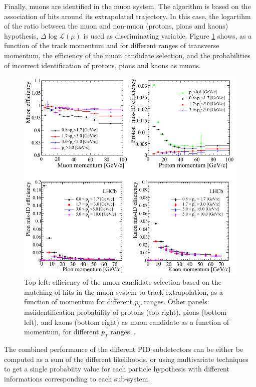 Finally, muons are identified in the muon system. The algorithm is based on the association of hits around its extrapolated trajectory. In this case, the logartihm of the ratio between the muon and non-muon (protons, pions and kaons)  hypothesis, $\Delta\log{\mathcal{L}(\mu)}$ is used as discriminating variable. Figure \ref{fig:PID5} shows, as a function of the track momentum and for different ranges of transverse momentum, the efficiency of the muon candidate selection, and the probabilities of incorrect identification of protons, pions and kaons as muons. 

\begin{figure} [htb!]
\begin{center}
\includegraphics[scale=0.7]{figs/PID5.png}
\caption{Top left: efficiency of the muon candidate selection based on the matching of hits in the muon system to track extrapolation, as a function of momentum for different $p_T$ ranges. Other panels: msiidentification probability of protons (top right), pions (bottom left), and kaons (bottom right) as muon candidate as a function of momentum, for different $p_T$ ranges~\cite{Aaij:2014jba}.\label{fig:PID5}}
\end{center}
\end{figure}

The combined performance of the different PID subdetectors can be either be computed as a sum of the different likelihoods, or using multivariate techniques to get a single probabiity value for each particle hypothesis with different informations corresponding to each sub-system. 


